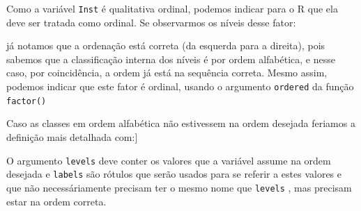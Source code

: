 \documentclass[
  10pt,
  a4paper]{book}
\newenvironment{Shaded}{\begin{snugshade}}{\end{snugshade}}
\newcommand{\AttributeTok}[1]{\textcolor[rgb]{0.77,0.63,0.00}{#1}}
\newcommand{\ConstantTok}[1]{\textcolor[rgb]{0.00,0.00,0.00}{#1}}
\newcommand{\FunctionTok}[1]{\textcolor[rgb]{0.00,0.00,0.00}{#1}}
\newcommand{\NormalTok}[1]{#1}
\newcommand{\OtherTok}[1]{\textcolor[rgb]{0.56,0.35,0.01}{#1}}
\newcommand{\SpecialCharTok}[1]{\textcolor[rgb]{0.00,0.00,0.00}{#1}}
\newcommand{\StringTok}[1]{\textcolor[rgb]{0.31,0.60,0.02}{#1}}
\begin{document}
Como a variável \texttt{Inst} é qualitativa ordinal, podemos indicar para o R
que ela deve ser tratada como ordinal. Se observarmos os níveis desse
fator:

\begin{Shaded}
\end{Shaded}

já notamos que a ordenação está correta (da esquerda para a direita),
pois sabemos que a classificação interna dos níveis é por ordem
alfabética, e nesse caso, por coincidência, a ordem já está na sequência
correta. Mesmo assim, podemos indicar que este fator é ordinal, usando o
argumento \texttt{ordered} da função \texttt{factor()}

\begin{Shaded}
\end{Shaded}

Caso as classes em ordem alfabética não estivessem na ordem desejada feriamos a definição mais detalhada com:{]}

\begin{Shaded}
\end{Shaded}

O argumento \texttt{levels} deve conter os valores que a variável assume na ordem desejada e \texttt{labels} são rótulos que serão usados para se referir a estes valores e que não necessáriamente precisam ter o mesmo nome que \texttt{levels} , mas precisam estar na ordem correta.
\end{document}
